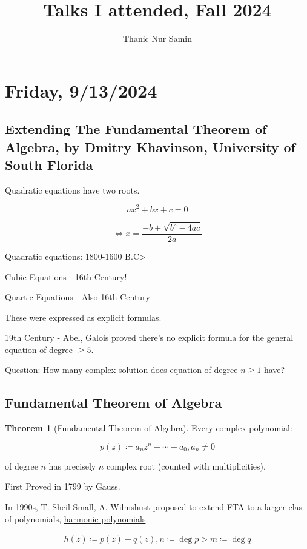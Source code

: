 \documentclass{article}
\title{Talks I attended, Fall 2024}
\author{Thanic Nur Samin}
\date{\vspace{-5ex}}
\theoremstyle{definition}
\newtheorem{theorem}{Theorem}
\begin{document}
\maketitle


\section*{Friday, 9/13/2024}

\subsection*{\centering Extending The Fundamental Theorem of Algebra, by Dmitry Khavinson, University of South Florida}

Quadratic equations have two roots.

\[
    ax^2 + bx + c = 0
\]

\[
    \iff x = \frac{-b+\sqrt{b^2 - 4ac}}{2a}
\]

Quadratic equations: 1800-1600 B.C>

Cubic Equations - 16th Century! 

Quartic Equations - Also 16th Century

These were expressed as explicit formulas.

19th Century - Abel, Galois proved there's no explicit formula for the general equation of degree \(\geq 5\). 

Question: How many complex solution does equation of degree \(n\geq 1\) have? 

\subsection*{Fundamental Theorem of Algebra}

\begin{theorem}[Fundamental Theorem of Algebra]
    Every complex polynomial:

    \[
        p(z) \coloneqq  a_n z^n + \cdots + a_0, a_n \neq 0
    \]

    of degree \(n\) has precisely \(n\) complex root (counted with multiplicities).
\end{theorem}

First Proved in 1799 by Gauss.

In 1990s, T. Sheil-Small, A. Wilmshust proposed to extend FTA to a larger clas of polynomials, \underline{harmonic polynomials}.

\[
    h(z) \coloneqq p(z) - \overline{q(z)}, n \coloneqq \deg p > m \coloneqq \deg q
\]
\end{document}
